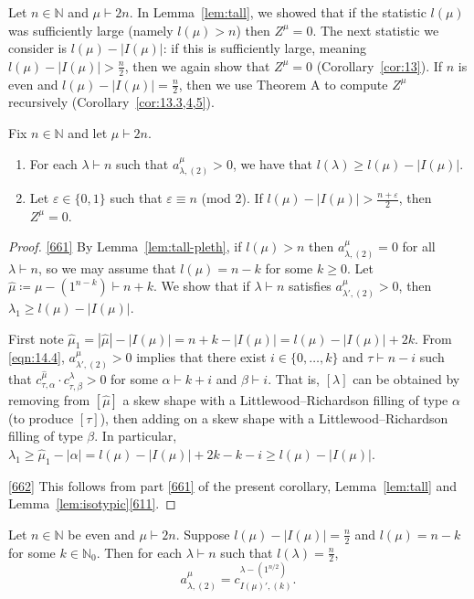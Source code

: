 \documentclass[ALCO, Unicode]{cedram}
\newcommand{\N}{\mathbb{N}}
\begin{document}
Let $n\in\N$ and $\mu\vdash 2n$. In Lemma~\ref{lem:tall}, we showed that if the statistic $l(\mu)$ was sufficiently large (namely $l(\mu)>n$) then $Z^\mu=0$. The next statistic we consider is $l(\mu)-|I(\mu)|$: if this is sufficiently large, meaning $l(\mu)-|I(\mu)|>\frac{n}{2}$, then we again show that $Z^\mu=0$ (Corollary~\ref{cor:13}). If $n$ is even and $l(\mu)-|I(\mu)|=\frac{n}{2}$, then we use Theorem A to compute $Z^\mu$ recursively (Corollary~\ref{cor:13.3,4,5}).

\begin{corollary}\label{cor:13}
	Fix $n\in\N$ and let $\mu\vdash 2n$.
	\begin{enumerate}[label=\textup{(\roman*)}]
		\item\label{661} For each $\lambda\vdash n$ such that $a^\mu_{\lambda,(2)}>0$, we have that $l(\lambda)\ge l(\mu)-|I(\mu)|$.
		\item \label{662} Let $\varepsilon\in\{0,1\}$ such that $\varepsilon\equiv n$ (mod 2). If $l(\mu)-|I(\mu)|>\frac{n+\varepsilon}{2}$, then $Z^\mu=0$.
	\end{enumerate}
\end{corollary}

\begin{proof}
	\ref{661} By Lemma~\ref{lem:tall-pleth}, if $l(\mu)>n$ then $a^\mu_{\lambda,(2)}=0$ for all $\lambda\vdash n$, so we may assume that $l(\mu)=n-k$ for some $k\ge 0$. Let $\hat{\mu}\coloneqq \mu-(1^{n-k})\vdash n+k$. We show that if $\lambda\vdash n$ satisfies $a^\mu_{\lambda',(2)}>0$, then $\lambda_1\ge l(\mu)-|I(\mu)|$.
	
	First note $\hat{\mu}_1=|\hat{\mu}|-|I(\mu)|=n+k-|I(\mu)|=l(\mu)-|I(\mu)|+2k$. From \eqref{eqn:14.4}, $a^\mu_{\lambda',(2)}>0$ implies that there exist $i\in\{0,\dotsc,k\}$ and $\tau\vdash n-i$ such that $c^{\hat{\mu}}_{\tau,\alpha}\cdot c^\lambda_{\tau,\beta}>0$ for some $\alpha\vdash k+i$ and $\beta\vdash i$. That is, $[\lambda]$ can be obtained by removing from $[\hat{\mu}]$ a skew shape with a Littlewood--Richardson filling of type $\alpha$ (to produce $[\tau]$), then adding on a skew shape with a Littlewood--Richardson filling of type $\beta$. In particular, $\lambda_1\ge \hat{\mu}_1-|\alpha|=l(\mu)-|I(\mu)|+2k-k-i\ge l(\mu)-|I(\mu)|$.
	
	\ref{662} This follows from part \ref{661} of the present corollary, Lemma~\ref{lem:tall} and Lemma~\ref{lem:isotypic}\ref{611}.
\end{proof}

\begin{proposition}\label{prop:13.2}
	Let $n\in\N$ be even and $\mu\vdash 2n$. 
	Suppose $l(\mu)-|I(\mu)|=\frac{n}{2}$ and $l(\mu)=n-k$ for some $k\in\N_0$. Then for each $\lambda\vdash n$ such that $l(\lambda)=\frac{n}{2}$, 
	\[ a^\mu_{\lambda,(2)} = c^{\lambda-(1^{n/2})}_{I(\mu)',(k)}. \]
\end{proposition}
\end{document}
